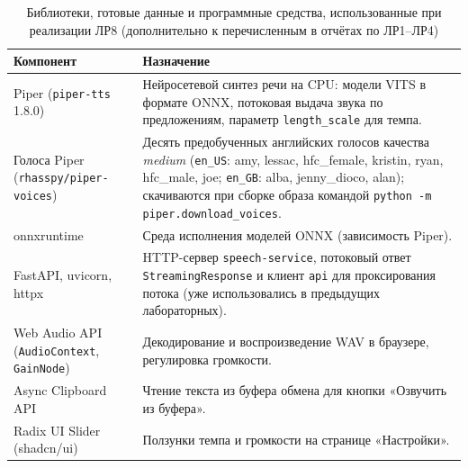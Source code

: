 \begin{table}[H]
  \centering
  \caption{Библиотеки, готовые данные и программные средства, использованные при реализации ЛР8 (дополнительно к перечисленным в отчётах по ЛР1--ЛР4)}
  \label{tab:stack-tts}
  \small
  \begin{tabularx}{\textwidth}{|l|X|}
    \hline
    Компонент & Назначение \\
    \hline
    Piper (\texttt{piper-tts} 1.8.0) & Нейросетевой синтез речи на CPU:
      модели VITS в формате ONNX, потоковая выдача звука по
      предложениям, параметр \texttt{length\_scale} для темпа. \\
    \hline
    Голоса Piper (\texttt{rhasspy/piper-voices}) & Десять
      предобученных английских голосов качества \emph{medium}
      (\texttt{en\_US}: amy, lessac, hfc\_female, kristin, ryan,
      hfc\_male, joe; \texttt{en\_GB}: alba, jenny\_dioco, alan);
      скачиваются при сборке образа командой
      \texttt{python -m piper.download\_voices}. \\
    \hline
    onnxruntime & Среда исполнения моделей ONNX (зависимость Piper). \\
    \hline
    FastAPI, uvicorn, httpx & HTTP-сервер \texttt{speech-service},
      потоковый ответ \texttt{StreamingResponse} и клиент
      \texttt{api} для проксирования потока (уже использовались в
      предыдущих лабораторных). \\
    \hline
    Web Audio API (\texttt{AudioContext}, \texttt{GainNode}) &
      Декодирование и воспроизведение WAV в браузере, регулировка
      громкости. \\
    \hline
    Async Clipboard API & Чтение текста из буфера обмена для кнопки
      «Озвучить из буфера». \\
    \hline
    Radix UI Slider (shadcn/ui) & Ползунки темпа и громкости на
      странице «Настройки». \\
    \hline
  \end{tabularx}
\end{table}

